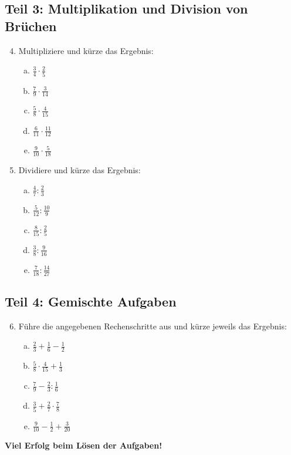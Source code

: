 \subsection*{Teil 3: Multiplikation und Division von Brüchen}
\begin{enumerate}
    \setcounter{enumi}{3}
    \item Multipliziere und kürze das Ergebnis:
    \begin{enumerate}[a)]
        \item $\frac{3}{4} \cdot \frac{2}{5}$
        \item $\frac{7}{9} \cdot \frac{3}{14}$
        \item $\frac{5}{8} \cdot \frac{4}{15}$
        \item $\frac{6}{11} \cdot \frac{11}{12}$
        \item $\frac{9}{10} \cdot \frac{5}{18}$
    \end{enumerate}
    \item Dividiere und kürze das Ergebnis:
    \begin{enumerate}[a)]
        \item $\frac{4}{7} : \frac{2}{3}$
        \item $\frac{5}{12} : \frac{10}{9}$
        \item $\frac{8}{15} : \frac{2}{5}$
        \item $\frac{3}{8} : \frac{9}{16}$
        \item $\frac{7}{18} : \frac{14}{27}$
    \end{enumerate}
\end{enumerate}

\subsection*{Teil 4: Gemischte Aufgaben}
\begin{enumerate}
    \setcounter{enumi}{5}
    \item Führe die angegebenen Rechenschritte aus und kürze jeweils das Ergebnis:
    \begin{enumerate}[a)]
        \item $\frac{2}{3} + \frac{1}{6} - \frac{1}{2}$
        \item $\frac{5}{8} \cdot \frac{4}{15} + \frac{1}{3}$
        \item $\frac{7}{9} - \frac{2}{3} : \frac{1}{6}$
        \item $\frac{3}{5} + \frac{2}{7} \cdot \frac{7}{8}$
        \item $\frac{9}{10} - \frac{1}{2} + \frac{3}{20}$
    \end{enumerate}
\end{enumerate}

\vspace{1cm}
\textbf{Viel Erfolg beim Lösen der Aufgaben!}

